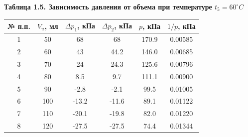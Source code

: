\documentclass[12pt]{article}
\begin{document}
\begin{flushleft}
    \begin{center}
        \textbf{Таблица 1.5. Зависимость давления от объема при температуре $ t_5 = 60^\circ C $} \\
    \end{center}
    \begin{table}[h]
        \centering
        \begin{tabular}{|c|c|c|c|c|c|}
            \hline
            № п.п. & $ V_u $, мл & $ \Delta p_1 $, кПа & $ \Delta p_2 $, кПа & $ p $, кПа & $ 1/p $, кПа \\
            \hline
            1  & 50  & 68    & 68    & 170.9 & 0.00585 \\
            \hline
            2  & 60  & 43    & 44.2  & 146.0 & 0.00685 \\
            \hline
            3  & 70  & 24    & 24.3  & 125.6 & 0.00796 \\
            \hline
            4  & 80  & 8.5   & 9.7   & 111.1 & 0.00900 \\
            \hline
            5  & 90  & -2.8  & -2.1  & 99.5  & 0.01005 \\
            \hline
            6  & 100 & -13.2 & -11.6 & 89.1  & 0.01122 \\
            \hline
            7  & 110 & -20.1 & -19.8 & 82.0  & 0.01220 \\
            \hline
            8  & 120 & -27.5 & -27.5 & 74.4  & 0.01344 \\
            \hline
        \end{tabular}    
    \end{table}

\end{flushleft}
\end{document}
